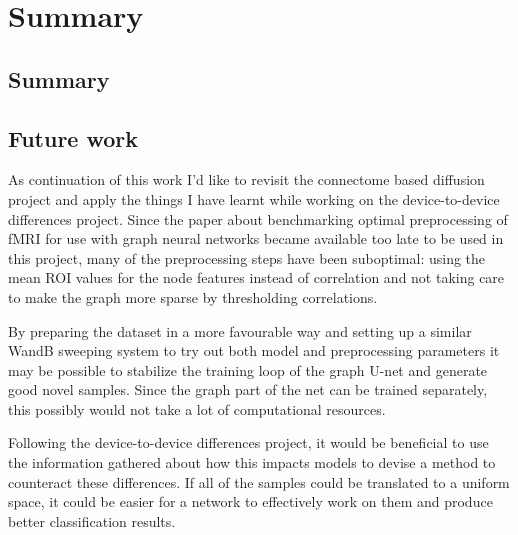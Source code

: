 \chapter{Summary}

\section{Summary}



\section{Future work}

As continuation of this work I'd like to revisit the connectome based diffusion project and apply the things I have learnt while working on the device-to-device differences project. Since the paper about benchmarking optimal preprocessing of fMRI for use with graph neural networks\cite{said2023neurograph} became available too late to be used in this project, many of the preprocessing steps have been suboptimal: using the mean ROI values for the node features instead of correlation and not taking care to make the graph more sparse by thresholding correlations.

By preparing the dataset in a more favourable way and setting up a similar WandB sweeping system to try out both model and preprocessing parameters it may be possible to stabilize the training loop of the graph U-net and generate good novel samples. Since the graph part of the net can be trained separately, this possibly would not take a lot of computational resources.

Following the device-to-device differences project, it would be beneficial to use the information gathered about how this impacts models to devise a method to counteract these differences. If all of the samples could be translated to a uniform space, it could be easier for a network to effectively work on them and produce better classification results.

